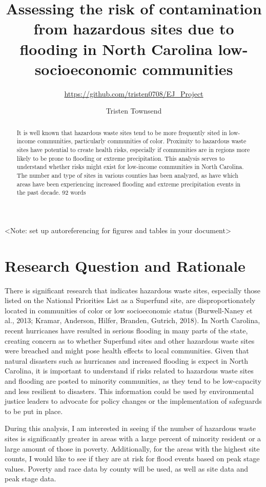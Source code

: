 \documentclass[12pt,]{article}
\title{Assessing the risk of contamination from hazardous sites due to flooding
in North Carolina low-socioeconomic communities}
\subtitle{\url{https://github.com/tristen0708/EJ_Project}}
\author{Tristen Townsend}
\date{}
\begin{document}
\maketitle
\begin{abstract}
It is well known that hazardous waste sites tend to be more frequently
sited in low-income communities, particularly communities of color.
Proximity to hazardous waste sites have potential to create health
risks, especially if communities are in regions more likely to be prone
to flooding or extreme precipitation. This analysis serves to understand
whether risks might exist for low-income communities in North Carolina.
The number and type of sites in various counties has been analyzed, as
have which areas have been experiencing increased flooding and extreme
precipitation events in the past decade. 92 words
\end{abstract}

\newpage

\tableofcontents  \newpage
\listoftables  \newpage
\listoffigures  \newpage

\textless{}Note: set up autoreferencing for figures and tables in your
document\textgreater{}

\section{Research Question and
Rationale}\label{research-question-and-rationale}

There is significant research that indicates hazardous waste sites,
especially those listed on the National Priorities List as a Superfund
site, are disproportionately located in communities of color or low
socioeconomic status (Burwell-Naney et al., 2013; Kramar, Anderson,
Hilfer, Branden, Gutrich, 2018). In North Carolina, recent hurricanes
have resulted in serious flooding in many parts of the state, creating
concern as to whether Superfund sites and other hazardous waste sites
were breached and might pose health effects to local communities. Given
that natural disasters such as hurricanes and increased flooding is
expect in North Carolina, it is important to understand if risks related
to hazardous waste sites and flooding are posted to minority
communities, as they tend to be low-capacity and less resilient to
disasters. This information could be used by environmental justice
leaders to advocate for policy changes or the implementation of
safeguards to be put in place.

During this analysis, I am interested in seeing if the number of
hazardous waste sites is significantly greater in areas with a large
percent of minority resident or a large amount of those in poverty.
Additionally, for the areas with the highest site counts, I would like
to see if they are at risk for flood events based on peak stage values.
Poverty and race data by county will be used, as well as site data and
peak stage data.
\end{document}

